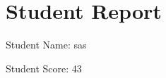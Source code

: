 \documentclass{article}
\begin{document}
\section*{Student Report}

Student Name: sas

Student Score: 43
\end{document}
